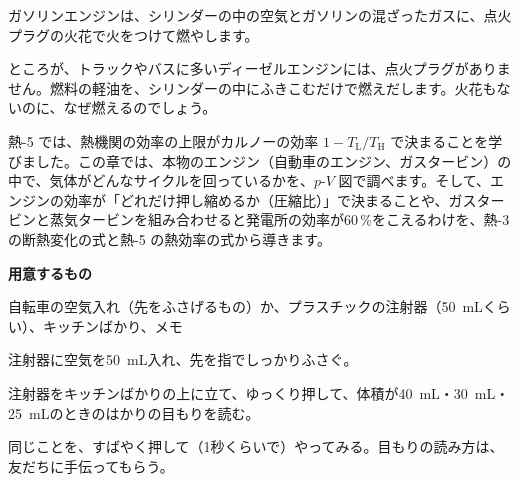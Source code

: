 \begin{hatena}
\noindent\begin{minipage}[c]{0.58\linewidth}\raggedright
ガソリンエンジンは、シリンダーの中の空気とガソリンの混ざったガスに、点火プラグの火花で火をつけて燃やします。

ところが、トラックやバスに多いディーゼルエンジンには、点火プラグがありません。燃料の軽油を、シリンダーの中にふきこむだけで燃えだします。火花もないのに、なぜ燃えるのでしょう。
\end{minipage}\hfill
\begin{minipage}[c]{0.38\linewidth}\centering
{}
\end{minipage}
\end{hatena}

\noindent 熱-5 では、熱機関の効率の上限がカルノーの効率 $1-T_{\mathrm L}/T_{\mathrm H}$ で決まることを学びました。この章では、本物のエンジン（自動車のエンジン、ガスタービン）の中で、気体がどんなサイクルを回っているかを、$p$-$V$ 図で調べます。そして、エンジンの効率が「どれだけ押し縮めるか（圧縮比）」で決まることや、ガスタービンと蒸気タービンを組み合わせると発電所の効率が60\,\%をこえるわけを、熱-3 の断熱変化の式と熱-5 の熱効率の式から導きます。

\begin{yattemiyou}
\textbf{用意するもの}\par
自転車の空気入れ（先をふさげるもの）か、プラスチックの注射器（\qty{50}{mL}くらい）、キッチンばかり、メモ\par\vspace{2pt}
\begin{enumerate}[label={\bkcircled[bkGreen]{\arabic*}}, leftmargin=2.4\zw, itemsep=1pt, topsep=2pt]
\item 注射器に空気を\qty{50}{mL}入れ、先を指でしっかりふさぐ。
\item 注射器をキッチンばかりの上に立て、ゆっくり押して、体積が\qty{40}{mL}・\qty{30}{mL}・\qty{25}{mL}のときのはかりの目もりを読む。
\item 同じことを、すばやく押して（1秒くらいで）やってみる。目もりの読み方は、友だちに手伝ってもらう。
\end{enumerate}
\end{yattemiyou}


